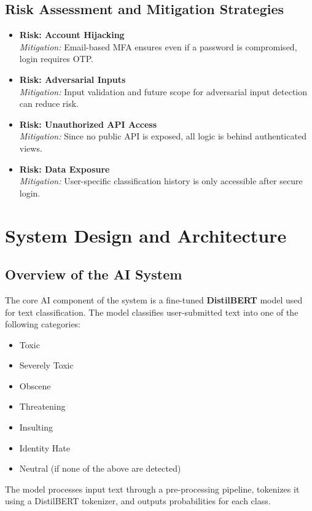 \documentclass[a4paper,12pt]{article}
\begin{document}
\subsection{Risk Assessment and Mitigation Strategies}
\begin{itemize}
    \item \textbf{Risk: Account Hijacking} \\
    \textit{Mitigation:} Email-based MFA ensures even if a password is compromised, login requires OTP.
    
    \item \textbf{Risk: Adversarial Inputs} \\
    \textit{Mitigation:} Input validation and future scope for adversarial input detection can reduce risk.
    
    \item \textbf{Risk: Unauthorized API Access} \\
    \textit{Mitigation:} Since no public API is exposed, all logic is behind authenticated views.

    \item \textbf{Risk: Data Exposure} \\
    \textit{Mitigation:} User-specific classification history is only accessible after secure login.
\end{itemize}

\section{System Design and Architecture}

\subsection{Overview of the AI System}
The core AI component of the system is a fine-tuned \textbf{DistilBERT} model used for text classification. The model classifies user-submitted text into one of the following categories:
\begin{itemize}
    \item Toxic
    \item Severely Toxic
    \item Obscene
    \item Threatening
    \item Insulting
    \item Identity Hate
    \item Neutral (if none of the above are detected)
\end{itemize}
The model processes input text through a pre-processing pipeline, tokenizes it using a DistilBERT tokenizer, and outputs probabilities for each class.
\end{document}
